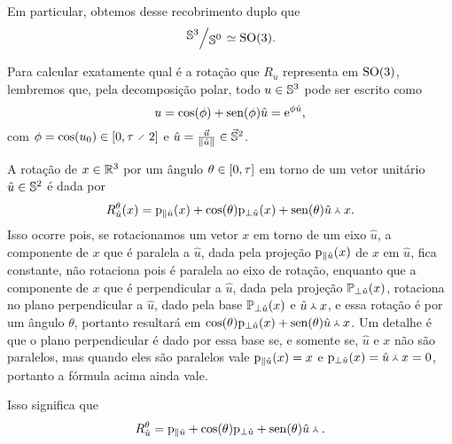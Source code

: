 Em particular, obtemos desse recobrimento duplo que
	\begin{equation*}
	\quo{\S^3}{\S^0} \simeq \SO(3).
	\end{equation*}

Para calcular exatamente qual é a rotação que $R_u$ representa em $\SO(3)$, lembremos que, pela decomposição polar, todo $u \in \S^3$ pode ser escrito como
	\begin{equation*}
	u = \cos(\phi) + \sin(\phi)\hat{u} = \e^{\phi \hat{u}},
	\end{equation*}
com $\phi = \cos(\esc{u}) \in \intff{0}{\tau \div 2}$ e $\hat{u} = \frac{\vec{u}}{\nor{\hat{u}}} \in \vec{\S}^2$.

A rotação de $x \in \R^3$ por um ângulo $\theta \in \intff{0}{\tau}$ em torno de um vetor unitário $\hat{u} \in \S^2$ é dada por
	\begin{equation*}
	R^{\theta}_{\hat{u}}(x) = \proj_{\parallel \hat{u}}(x) + \cos(\theta) \proj_{\perp \hat{u}}(x) + \sin(\theta) \pvec{\hat{u}}{x}.
	\end{equation*}
Isso ocorre pois, se rotacionamos um vetor $x$ em torno de um eixo $\hat{u}$, a componente de $x$ que é paralela a $\hat{u}$, dada pela projeção $\proj_{\parallel \hat{u}}(x)$ de $x$ em $\hat{u}$, fica constante, não rotaciona pois é paralela ao eixo de rotação, enquanto que a componente de $x$ que é perpendicular a $\hat{u}$, dada pela projeção $\pro_{\perp \hat{u}}(x)$, rotaciona no plano perpendicular a $\hat{u}$, dado pela base $\pro_{\perp \hat{u}}(x)$ e $\pvec{\hat{u}}{x}$, e essa rotação é por um ângulo $\theta$, portanto resultará em $\cos(\theta) \proj_{\perp \hat{u}}(x) + \sin(\theta) \pvec{\hat{u}}{x}$. Um detalhe é que o plano perpendicular é dado por essa base se, e somente se, $\hat{u}$ e $x$ não são paralelos, mas quando eles são paralelos vale $\proj_{\parallel \hat{u}}(x)=x$ e $\proj_{\perp \hat{u}}(x) = \pvec{\hat{u}}{x} = 0$, portanto a fórmula acima ainda vale.

Isso significa que
	\begin{equation*}
	R^{\theta}_{\hat{u}} = \proj_{\parallel \hat{u}} + \cos(\theta) \proj_{\perp \hat{u}} + \sin(\theta){ \pvec{\hat{u}}{}} .
	\end{equation*}

